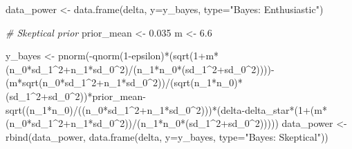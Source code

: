 \documentclass[
]{book}
\newenvironment{Shaded}{\begin{snugshade}}{\end{snugshade}}
\newcommand{\AttributeTok}[1]{\textcolor[rgb]{0.77,0.63,0.00}{#1}}
\newcommand{\CommentTok}[1]{\textcolor[rgb]{0.56,0.35,0.01}{\textit{#1}}}
\newcommand{\DecValTok}[1]{\textcolor[rgb]{0.00,0.00,0.81}{#1}}
\newcommand{\FloatTok}[1]{\textcolor[rgb]{0.00,0.00,0.81}{#1}}
\newcommand{\FunctionTok}[1]{\textcolor[rgb]{0.00,0.00,0.00}{#1}}
\newcommand{\NormalTok}[1]{#1}
\newcommand{\OtherTok}[1]{\textcolor[rgb]{0.56,0.35,0.01}{#1}}
\newcommand{\SpecialCharTok}[1]{\textcolor[rgb]{0.00,0.00,0.00}{#1}}
\newcommand{\StringTok}[1]{\textcolor[rgb]{0.31,0.60,0.02}{#1}}
\begin{document}
\begin{Shaded}
\begin{Highlighting}[]
\NormalTok{data\_power }\OtherTok{\textless{}{-}} \FunctionTok{data.frame}\NormalTok{(delta, }\AttributeTok{y=}\NormalTok{y\_bayes, }\AttributeTok{type=}\StringTok{"Bayes: Enthusiastic"}\NormalTok{)}

\CommentTok{\# Skeptical prior}
\NormalTok{prior\_mean }\OtherTok{\textless{}{-}} \FloatTok{0.035}
\NormalTok{m }\OtherTok{\textless{}{-}} \FloatTok{6.6}

\NormalTok{y\_bayes }\OtherTok{\textless{}{-}} \FunctionTok{pnorm}\NormalTok{(}\SpecialCharTok{{-}}\FunctionTok{qnorm}\NormalTok{(}\DecValTok{1}\SpecialCharTok{{-}}\NormalTok{epsilon)}\SpecialCharTok{*}\NormalTok{(}\FunctionTok{sqrt}\NormalTok{(}\DecValTok{1}\SpecialCharTok{+}\NormalTok{m}\SpecialCharTok{*}\NormalTok{(n\_0}\SpecialCharTok{*}\NormalTok{sd\_1}\SpecialCharTok{\^{}}\DecValTok{2}\SpecialCharTok{+}\NormalTok{n\_1}\SpecialCharTok{*}\NormalTok{sd\_0}\SpecialCharTok{\^{}}\DecValTok{2}\NormalTok{)}\SpecialCharTok{/}\NormalTok{(n\_1}\SpecialCharTok{*}\NormalTok{n\_0}\SpecialCharTok{*}\NormalTok{(sd\_1}\SpecialCharTok{\^{}}\DecValTok{2}\SpecialCharTok{+}\NormalTok{sd\_0}\SpecialCharTok{\^{}}\DecValTok{2}\NormalTok{))))}\SpecialCharTok{{-}}\NormalTok{(m}\SpecialCharTok{*}\FunctionTok{sqrt}\NormalTok{(n\_0}\SpecialCharTok{*}\NormalTok{sd\_1}\SpecialCharTok{\^{}}\DecValTok{2}\SpecialCharTok{+}\NormalTok{n\_1}\SpecialCharTok{*}\NormalTok{sd\_0}\SpecialCharTok{\^{}}\DecValTok{2}\NormalTok{))}\SpecialCharTok{/}\NormalTok{(}\FunctionTok{sqrt}\NormalTok{(n\_1}\SpecialCharTok{*}\NormalTok{n\_0)}\SpecialCharTok{*}\NormalTok{(sd\_1}\SpecialCharTok{\^{}}\DecValTok{2}\SpecialCharTok{+}\NormalTok{sd\_0}\SpecialCharTok{\^{}}\DecValTok{2}\NormalTok{))}\SpecialCharTok{*}\NormalTok{prior\_mean}\SpecialCharTok{{-}}\FunctionTok{sqrt}\NormalTok{((n\_1}\SpecialCharTok{*}\NormalTok{n\_0)}\SpecialCharTok{/}\NormalTok{((n\_0}\SpecialCharTok{*}\NormalTok{sd\_1}\SpecialCharTok{\^{}}\DecValTok{2}\SpecialCharTok{+}\NormalTok{n\_1}\SpecialCharTok{*}\NormalTok{sd\_0}\SpecialCharTok{\^{}}\DecValTok{2}\NormalTok{)))}\SpecialCharTok{*}\NormalTok{(delta}\SpecialCharTok{{-}}\NormalTok{delta\_star}\SpecialCharTok{*}\NormalTok{(}\DecValTok{1}\SpecialCharTok{+}\NormalTok{(m}\SpecialCharTok{*}\NormalTok{(n\_0}\SpecialCharTok{*}\NormalTok{sd\_1}\SpecialCharTok{\^{}}\DecValTok{2}\SpecialCharTok{+}\NormalTok{n\_1}\SpecialCharTok{*}\NormalTok{sd\_0}\SpecialCharTok{\^{}}\DecValTok{2}\NormalTok{))}\SpecialCharTok{/}\NormalTok{(n\_1}\SpecialCharTok{*}\NormalTok{n\_0}\SpecialCharTok{*}\NormalTok{(sd\_1}\SpecialCharTok{\^{}}\DecValTok{2}\SpecialCharTok{+}\NormalTok{sd\_0}\SpecialCharTok{\^{}}\DecValTok{2}\NormalTok{)))))}
\NormalTok{data\_power }\OtherTok{\textless{}{-}} \FunctionTok{rbind}\NormalTok{(data\_power, }\FunctionTok{data.frame}\NormalTok{(delta, }\AttributeTok{y=}\NormalTok{y\_bayes, }\AttributeTok{type=}\StringTok{"Bayes: Skeptical"}\NormalTok{))}


\end{Highlighting}
\end{Shaded}
\end{document}
